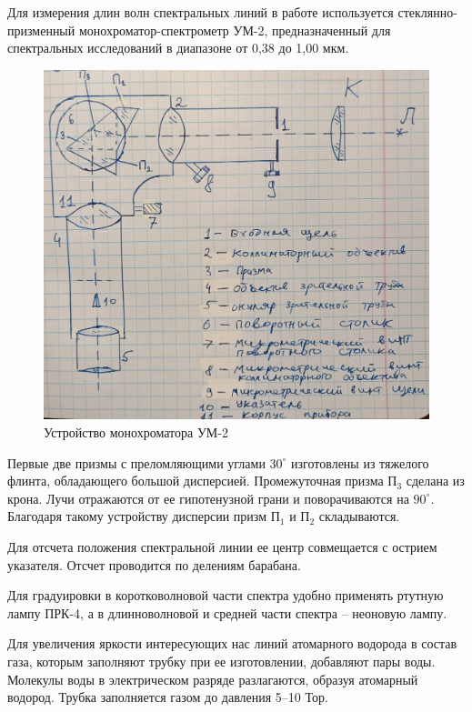 	\newpage
	Для измерения длин волн спектральных линий в работе используется стеклянно-призменный монохроматор-спектрометр УМ-2, предназначенный для спектральных исследований в диапазоне от 0,38 до 1,00 мкм.
	\begin{figure}[h!]
		\centering
		\includegraphics[width=\linewidth]{Pictures/State}
		\caption{Устройство монохроматора УМ-2}
	\end{figure}
	Первые две призмы с преломляющими углами $30^\circ$ изготовлены из тяжелого флинта, обладающего большой дисперсией. Промежуточная призма П$_3$ сделана из крона. Лучи отражаются от ее гипотенузной грани и поворачиваются на $90^\circ$. Благодаря такому устройству дисперсии призм П$_1$ и П$_2$ складываются.
	
	Для отсчета положения спектральной линии ее центр совмещается с острием указателя. Отсчет проводится по делениям барабана.
	
	Для градуировки в коротковолновой части спектра удобно применять ртутную лампу ПРК-4, а в длинноволновой и средней части спектра -- неоновую лампу. 
	
	Для увеличения яркости интересующих нас линий атомарного водорода в состав газа, которым заполняют трубку при ее изготовлении, добавляют пары воды. Молекулы воды в электрическом разряде разлагаются, образуя атомарный водород. Трубка заполняется газом до давления 5–10 Тор.
	

